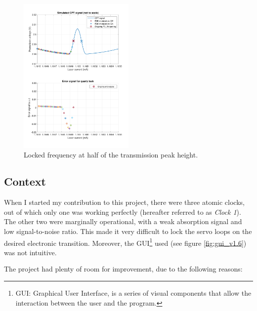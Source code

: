 \documentclass[a4paper,12pt]{article}
\begin{document}
\begin{figure}[h!]
	\centering
	\includegraphics[width=0.5\textwidth]{animation_quartz_servo_loop/quartz_28.pdf}
	\caption{Locked frequency at half of the transmission peak height.}
	\label{fig:transmission_peak}
\end{figure}

\newpage
\subsection{Context}
When I started my contribution to this project, there were three atomic clocks, out of which only one was working perfectly (hereafter referred to as \textit{Clock 1}). The other two were marginally operational, with a weak absorption signal and low signal-to-noise ratio. This made it very difficult to lock the servo loops on the desired electronic transition. Moreover, the GUI\footnote{GUI: Graphical User Interface, is a series of visual components that allow the interaction between the user and the program.} used (see figure \ref{fig:gui_v1.6}) was not intuitive.

The project had plenty of room for improvement, due to  the following reasons:
\end{document}
